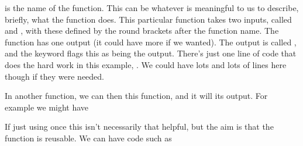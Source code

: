 \documentclass[letterpaper,10pt,british]{sphinxmanual}
\begin{document}
\sphinxAtStartPar
{} is the name of the function. This can be whatever is meaningful to us to describe, briefly, what the function does. This particular function takes two inputs, called  and , with these defined by the round brackets  after the function name. The function has one output (it could have more if we wanted). The output is called , and the keyword  flags this as being the output. There’s just one line of code that does the hard work in this example, . We could have lots and lots of lines here though if they were needed.

\sphinxAtStartPar
In another function, we can then  this function, and it will  its output. For example we might have

\begin{sphinxVerbatim}[commandchars=\\\{\}]
      
      
       
\end{sphinxVerbatim}

\sphinxAtStartPar
If just using  once this isn’t necessarily that helpful, but the aim is that the  function is reusable. We can have code such as

\begin{sphinxVerbatim}[commandchars=\\\{\}]
      
      
       
      
       
      
      
       
\end{sphinxVerbatim}
\end{document}
